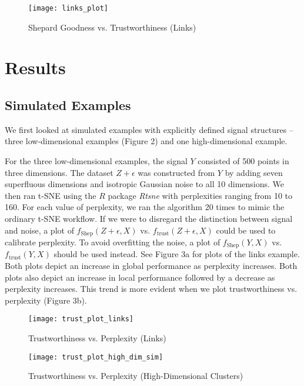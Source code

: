 \documentclass{article}
\begin{document}
\renewcommand{\thefigure}{3a}
\begin{figure*}[b]
\centering
\texttt{[image: links\_plot]}
\caption{Shepard Goodness vs. Trustworthiness (Links)}
\end{figure*}

\section{Results}

\subsection{Simulated Examples}
We first looked at simulated examples with explicitly defined signal structures -- three low-dimensional examples (Figure 2) and one high-dimensional example.

For the three low-dimensional examples, the signal $Y$ consisted of 500 points in three dimensions. The dataset $Z + \epsilon$ was constructed from $Y$ by adding seven superfluous dimensions and isotropic Gaussian noise to all 10 dimensions. We then ran t-SNE using the $R$ package \textit{Rtsne} with perplexities ranging from 10 to 160. For each value of perplexity, we ran the algorithm 20 times to mimic the ordinary t-SNE workflow. If we were to disregard the distinction between signal and noise, a plot of $f_\textrm{Shep}(Z + \epsilon, X)$ vs. $f_\textrm{trust}(Z + \epsilon, X)$ could be used to calibrate perplexity. To avoid overfitting the noise, a plot of $f_\textrm{Shep}(Y, X)$ vs. $f_\textrm{trust}(Y, X)$ should be used instead. See Figure 3a for plots of the links example. Both plots depict an increase in global performance as perplexity increases. Both plots also depict an increase in local performance followed by a decrease as perplexity increases. This trend is more evident when we plot trustworthiness vs. perplexity (Figure 3b).


\renewcommand{\thefigure}{3b}
\begin{figure*}[t]
\centering
\texttt{[image: trust\_plot\_links]}
\caption{Trustworthiness vs. Perplexity (Links)}
\end{figure*}

\renewcommand{\thefigure}{4}
\begin{figure*}[b]
\centering
\texttt{[image: trust\_plot\_high\_dim\_sim]}
\caption{Trustworthiness vs. Perplexity (High-Dimensional Clusters)}
\end{figure*}
\end{document}
